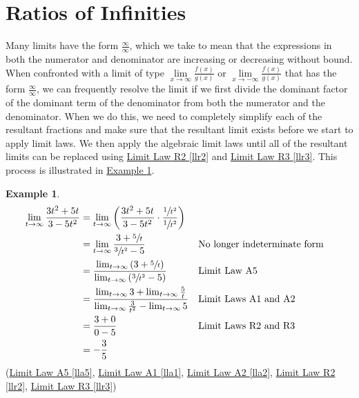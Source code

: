 \documentclass[12pt,]{book}
\theoremstyle{plain}
\theoremstyle{definition}
\newtheorem{example}[theorem]{Example}
\numberwithin{equation}{section}
\newcommand{\fe}[2]{#1\mathopen{}\left(#2\right)\mathclose{}}
\begin{document}
\section[Ratios of Infinities]{Ratios of Infinities}\label{section-ratios-of-infinities}
Many limits have the form \(\frac{\infty}{\infty}\), which we take to mean that the expressions in both the numerator and denominator are increasing or decreasing without bound. When confronted with a limit of type \(\lim\limits_{x\to\infty}\frac{\fe{f}{x}}{\fe{g}{x}}\) or \(\lim\limits_{x\to-\infty}\frac{\fe{f}{x}}{\fe{g}{x}}\) that has the form \(\frac{\infty}{\infty}\), we can frequently resolve the limit if we first divide the dominant factor of the dominant term of the denominator from both the numerator and the denominator. When we do this, we need to completely simplify each of the resultant fractions and make sure that the resultant limit exists before we start to apply limit laws. We then apply the algebraic limit laws until all of the resultant limits can be replaced using \hyperref[llr2]{Limit Law R2 \ref{llr2}} and \hyperref[llr3]{Limit Law R3 \ref{llr3}}. This process is illustrated in \hyperref[example-ratio-of-infinities]{Example \ref{example-ratio-of-infinities}}.%
\begin{example}\label{example-ratio-of-infinities}
\begin{align*}
\lim_{t\to\infty}\frac{3t^2+5t}{3-5t^2}&=\lim_{t\to\infty}\left(\frac{3t^2+5t}{3-5t^2}\cdot\frac{\sfrac{1}{t^2}}{\sfrac{1}{t^2}}\right)\\
&=\lim_{t\to\infty}\frac{3+\sfrac{5}{t}}{\sfrac{3}{t^2}-5}&&\text{No longer indeterminate form}\\
&=\frac{\lim_{t\to\infty}\left(3+\sfrac{5}{t}\right)}{\lim_{t\to\infty}\left(\sfrac{3}{t^2}-5\right)}&&\text{Limit Law A5}\\
&=\frac{\lim_{t\to\infty}3+\lim_{t\to\infty}\frac{5}{t}}{\lim_{t\to\infty}\frac{3}{t^2}-\lim_{t\to\infty}5}&&\text{Limit Laws A1 and A2}\\
&=\frac{3+0}{0-5}&&\text{Limit Laws R2 and R3}\\
&=-\frac{3}{5}
\end{align*}(\hyperref[lla5]{Limit Law A5 \ref{lla5}}, \hyperref[lla1]{Limit Law A1 \ref{lla1}}, \hyperref[lla2]{Limit Law A2 \ref{lla2}}, \hyperref[llr2]{Limit Law R2 \ref{llr2}}, \hyperref[llr3]{Limit Law R3 \ref{llr3}})%
\end{example}
\typeout{************************************************}
\typeout{************************************************}
\end{document}
